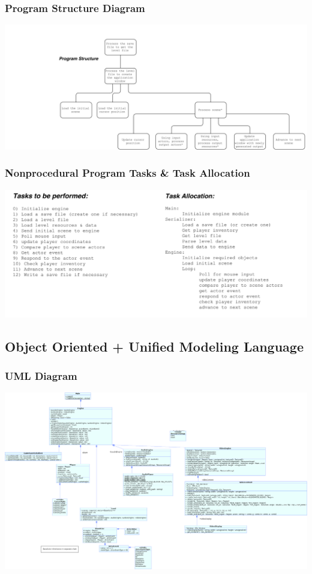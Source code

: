 \documentclass{article}
\begin{document}
		\subsubsection{Program Structure Diagram}
			\begin{center}
				\includegraphics[scale=0.4]{jackson2}
			\end{center}
		\subsubsection{Nonprocedural Program Tasks \& Task Allocation}
			\begin{center}
				\includegraphics[scale=0.5]{jackson34}
			\end{center}
	\subsection{Object Oriented + Unified Modeling Language}
		\subsubsection{UML Diagram}
			\begin{center}
				\includegraphics[scale=0.27]{MainClasses}
			\end{center}
\end{document}
